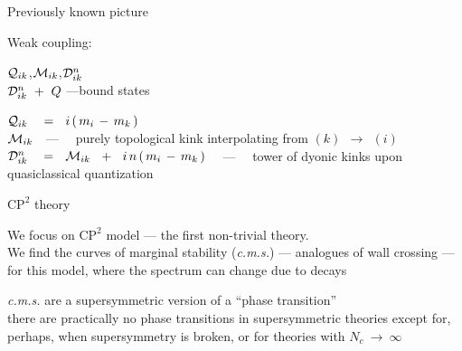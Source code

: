 \documentclass{beamer}
\begin{document}
\begin{frame}{}

	Previously known picture

\begin{block}{Weak coupling:}  

\vspace{2mm}
	\qquad\qquad
	\qquad\qquad
	$ \mathcal{Q}_{ik} $,\quad $ \mathcal{M}_{ik} $,\quad $ \mathcal{D}_{ik}^n $\\[0.5cm]

	\qquad\qquad
	\qquad\qquad
	$ \mathcal{D}_{ik}^n ~+~ Q $ \quad---\quad bound states
\vspace{1mm}
\end{block}

\begin{block}{}
$
	\mathcal{Q}_{ik}  ~~~=~~  i\, (\, m_i \,-\, m_k \,)
$\\[4mm]

$ \mathcal{M}_{ik} $ \,~---~~ purely topological kink interpolating from $(k) ~~\rightarrow~~ (i)$
\\[4mm]

$
	\mathcal{D}_{ik}^n  ~~~=~~ \mathcal{M}_{ik}  ~~+~~ i\, n\, (\, m_i \,-\, m_k \,)
$ 
	~~---~~ tower of dyonic kinks upon\\
\hspace{7cm} quasiclassical quantization
\vspace{1mm}
\end{block}

\end{frame}


\begin{frame}{$\text{CP}^2$ theory}

	We focus on $\text{CP}^2$ model --- the first non-trivial theory.\\[2mm]

	We find the curves of marginal stability ({\it c.m.s.}) --- analogues of wall crossing --- 
	for this model, where the spectrum can change due to decays

	\pause
\begin{block}{}
\vspace{2mm}

	\alert{\it c.m.s.} are a supersymmetric version of a ``phase transition''\\[1mm]
	there are practically no phase transitions in supersymmetric theories
	except for, perhaps, when supersymmetry is broken, 
	or for theories with $ N_c ~\to~ \infty $
	
\vspace{2mm}
\end{block}

\end{frame}
\end{document}

